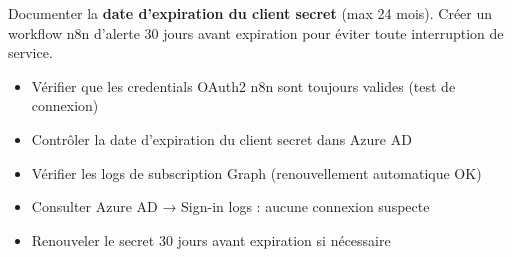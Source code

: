 \documentclass[11pt, a4paper]{article}
\begin{document}
\begin{attention}
  Documenter la \textbf{date d'expiration du client secret} (max 24 mois). Créer un workflow n8n d'alerte 30 jours avant expiration pour éviter toute interruption de service.
\end{attention}

\begin{checklist}
  \begin{itemize}
    \item[$\square$] Vérifier que les credentials OAuth2 n8n sont toujours valides (test de connexion)
    \item[$\square$] Contrôler la date d'expiration du client secret dans Azure AD
    \item[$\square$] Vérifier les logs de subscription Graph (renouvellement automatique OK)
    \item[$\square$] Consulter Azure AD → Sign-in logs : aucune connexion suspecte
    \item[$\square$] Renouveler le secret 30 jours avant expiration si nécessaire
  \end{itemize}
\end{checklist}
\end{document}
